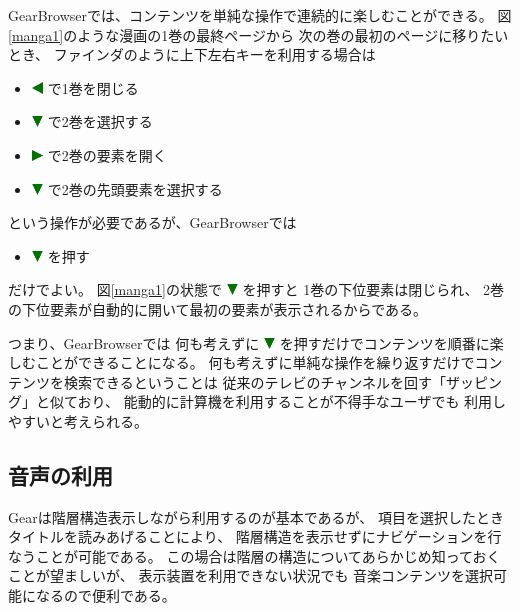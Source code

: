 \documentclass[twoside]{wiss}
\def\GEAR{\textsf{Gear}}
\def\GB{\textsf{GearBrowser}}
\def\down{ \includegraphics[width=3mm,bb=0 0 36 36]{figures/downtriangle.pdf} }
\def\right{ \includegraphics[width=3mm,bb=0 0 36 36]{figures/righttriangle.pdf} }
\def\left{ \includegraphics[width=3mm,bb=0 0 36 36]{figures/lefttriangle.pdf} }
\begin{document}
{\GB}では、コンテンツを単純な操作で連続的に楽しむことができる。
%
図\ref{manga1}のような漫画の1巻の最終ページから
次の巻の最初のページに移りたいとき、
ファインダのように上下左右キーを利用する場合は

\begin{itemize}
\item {\left}で1巻を閉じる
\item {\down}で2巻を選択する
\item {\right}で2巻の要素を開く
\item {\down}で2巻の先頭要素を選択する
\end{itemize}

\noindent
という操作が必要であるが、{\GB}では

\begin{itemize}
\item {\down}を押す
\end{itemize}

\noindent
だけでよい。
図\ref{manga1}の状態で{\down}を押すと
1巻の下位要素は閉じられ、
2巻の下位要素が自動的に開いて最初の要素が表示されるからである。

つまり、{\GB}では
何も考えずに
{\down}を押すだけでコンテンツを順番に楽しむことができることになる。
何も考えずに単純な操作を繰り返すだけでコンテンツを検索できるということは
従来のテレビのチャンネルを回す「ザッピング」と似ており、
能動的に計算機を利用することが不得手なユーザでも
利用しやすいと考えられる。


\subsection{音声の利用}

{\GEAR}は階層構造表示しながら利用するのが基本であるが、
項目を選択したときタイトルを読みあげることにより、
階層構造を表示せずにナビゲーションを行なうことが可能である。
この場合は階層の構造についてあらかじめ知っておくことが望ましいが、
表示装置を利用できない状況でも
音楽コンテンツを選択可能になるので便利である。

% 
\end{document}
